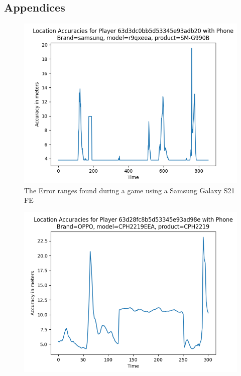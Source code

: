 \documentclass{l4proj}
\begin{document}
%
% 

\begin{appendices}

\chapter{Appendices}

\begin{figure}
    \centering
    \includegraphics[width=1.0\linewidth]{images/my_phone.png} 
    \caption{The Error ranges found during a game using a Samsung Galaxy S21 FE}
    \label{fig:galaxys21}
\end{figure}
\begin{figure}
    \centering
    \includegraphics[width=1.0\linewidth]{images/oppo.png}

\end{figure}
\end{appendices}
\end{document}
